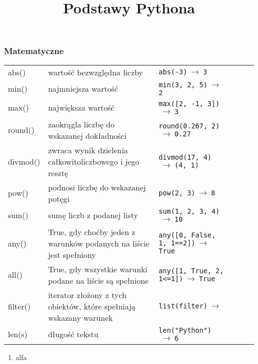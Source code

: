 \documentclass[a4paper]{article}
\title{Podstawy Pythona}
\begin{document}
\subsubsection*{Matematyczne}
\begin{tabularx}{\textwidth}{lp{}|lp{}|lp{}}
abs() & wartość bezwzględna liczby & \verb|abs(-3)|$\ \to\ $\verb|3|\\
min() & najmniejsza wartość & \verb|min(3, 2, 5)|$\ \to\ $\verb|2| \\
max() & największa wartość & \verb|max([2, -1, 3])|$\ \to\ $\verb|3|\\
round() & zaokrągla liczbę do wskazanej dokładności &  \verb|round(0.267, 2)|$\ \to\ $\verb|0.27|\\

divmod() & zwraca wynik dzielenia całkowitoliczbowego i jego resztę & \verb|divmod(17, 4)|$\ \to\ $\verb|(4, 1)|\\
pow() & podnosi liczbę do wskazanej potęgi & \verb|pow(2, 3)|$\ \to\ $\verb|8|\\
sum() & sumę liczb z podanej listy & \verb|sum(1, 2, 3, 4)|$\ \to\ $\verb|10|\\
any() & True, gdy choćby jeden z warunków podanych na liście jest spełniony & \verb|any([0, False, 1, 1==2])|$\ \to\ $\verb|True|\\
all() & True, gdy wszystkie warunki podane na liście są spełnione & \verb|any([1, True, 2, 1<=1])|$\ \to\ $\verb|True|\\
filter() & iterator złożony z tych obiektów, które spełniają wskazany warunek & \verb|list(filter)|$\ \to\ $ \\
len(s) & długość tekstu & \verb|len("Python")|$\ \to\ $\verb|6|
\end{tabularx}

\begin{enumerate}[--]
    \item alfa
\end{enumerate}
\end{document}
